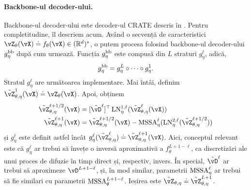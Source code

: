 \documentclass[../../book-main_ro.tex]{subfiles}
\begin{document}
\paragraph{Backbone-ul decoder-ului.} Backbone-ul decoder-ului este decoder-ul CRATE descris în . Pentru completitudine, îl descriem acum. Având o secvență de caracteristici \(\vZ_{\theta}(\vX) \doteq f_{\theta}(\vX) \in (\R^{d})^{*}\), o putem procesa folosind backbone-ul decoder-ului \(g_{\eta}^{\mathrm{bb}}\) după cum urmează. Funcția \(g_{\eta}^{\mathrm{bb}}\) este compusă din \(L\) straturi \(g_{\eta}^{\ell}\), adică,
\begin{equation}
    g_{\eta}^{\mathrm{bb}} = g_{\eta}^{L} \circ \cdots \circ g_{\eta}^{1}.
\end{equation}
Stratul \(g_{\eta}^{\ell}\) are următoarea implementare. Mai întâi, definim \(\tilde{\vZ}_{\theta, \eta}^{1}(\vX) \doteq \vZ_{\theta}(\vX)\). Apoi, obținem
\begin{align}
    \tilde{\vZ}_{\theta, \eta}^{\ell + 1/2}(\vX) 
    &= [\tilde{\vD}^{\ell}]^{\top}\LN_{\eta}^{1, \ell}(\tilde{\vZ}_{\theta, \eta}^{\ell}(\vX)) \\ 
    \tilde{\vZ}_{\theta, \eta}^{\ell + 1}(\vX)
    &= \tilde{\vZ}_{\theta, \eta}^{\ell + 1/2}(\vX) - \MSSA_{\eta}^{\ell}(\LN_{\eta}^{2, \ell}(\tilde{\vZ}_{\theta, \eta}^{\ell + 1/2}))
\end{align}
și \(g_{\eta}^{\ell}\) este definit astfel încât \(g_{\eta}^{\ell}(\tilde{\vZ}_{\theta, \eta}^{\ell}) \doteq \tilde{\vZ}_{\theta, \eta}^{\ell + 1}(\vX)\). Aici, conceptul relevant este că \(g_{\eta}^{\ell}\) ar trebui să învețe o inversă aproximativă a \(f_{\theta}^{L + 1 - \ell}\), ca discretizări ale unui proces de difuzie în timp direct și, respectiv, invers. În special, \(\tilde{\vD}^{\ell}\) ar trebui să aproximeze \(\vD^{L + 1 - \ell}\), și, în mod similar, parametrii \(\operatorname{MSSA}_{\eta}^{\ell}\) ar trebui să fie similari cu parametrii \(\operatorname{MSSA}_{\theta}^{L + 1 - \ell}\). Ieșirea este \(\tilde{\vZ}_{\theta, \eta} \doteq \tilde{\vZ}_{\theta, \eta}^{L + 1}\).
\end{document}
